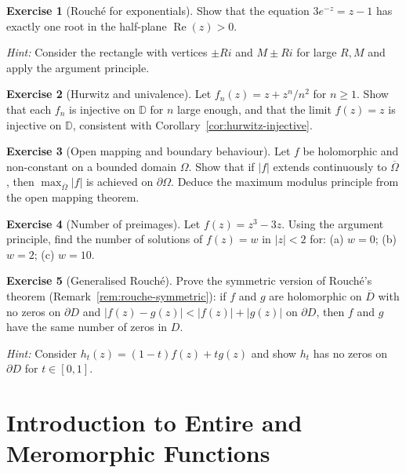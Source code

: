 \documentclass[12pt,a4paper,openany]{book}
\theoremstyle{definition}
\newtheorem{exercise}{Exercise}[chapter]
\theoremstyle{plain}
\theoremstyle{remark}
\newcommand{\D}{\mathbb{D}}
\DeclareMathOperator{\re}{Re}
\newcommand{\abs}[1]{\left|#1\right|}
\begin{document}
\begin{exercise}[Rouch\'{e} for exponentials]\label{exer:rouche-exp}
Show that the equation $3e^{-z} = z - 1$ has exactly one root in the
half-plane $\re(z) > 0$.

\emph{Hint:} Consider the rectangle with vertices $\pm Ri$ and $M \pm Ri$
for large $R, M$ and apply the argument principle.
\end{exercise}

\begin{exercise}[Hurwitz and univalence]\label{exer:hurwitz-unival}
Let $f_n(z) = z + z^n / n^2$ for $n \geq 1$. Show that each $f_n$ is
injective on $\D$ for $n$ large enough, and that the limit $f(z) = z$
is injective on $\D$, consistent with Corollary~\ref{cor:hurwitz-injective}.
\end{exercise}

\begin{exercise}[Open mapping and boundary behaviour]\label{exer:open-map-boundary}
Let $f$ be holomorphic and non-constant on a bounded domain $\Omega$.
Show that if $\abs{f}$ extends continuously to $\overline{\Omega}$,
then $\max_{\overline{\Omega}}\abs{f}$ is achieved on $\partial \Omega$.
Deduce the maximum modulus principle from the open mapping theorem.
\end{exercise}

\begin{exercise}[Number of preimages]\label{exer:preimage-count}
Let $f(z) = z^3 - 3z$. Using the argument principle, find the number of
solutions of $f(z) = w$ in $\abs{z} < 2$ for: (a) $w = 0$; (b) $w = 2$;
(c) $w = 10$.
\end{exercise}

\begin{exercise}[Generalised Rouch\'{e}]\label{exer:gen-rouche}
Prove the symmetric version of Rouch\'{e}'s theorem
(Remark~\ref{rem:rouche-symmetric}):
if $f$ and $g$ are holomorphic on $\overline{D}$ with no zeros on $\partial D$
and $\abs{f(z) - g(z)} < \abs{f(z)} + \abs{g(z)}$ on $\partial D$,
then $f$ and $g$ have the same number of zeros in $D$.

\emph{Hint:} Consider $h_t(z) = (1-t)f(z) + tg(z)$ and show $h_t$
has no zeros on $\partial D$ for $t \in [0,1]$.
\end{exercise}


\chapter{Introduction to Entire and Meromorphic Functions}\label{ch:entire-meromorphic}
\end{document}
